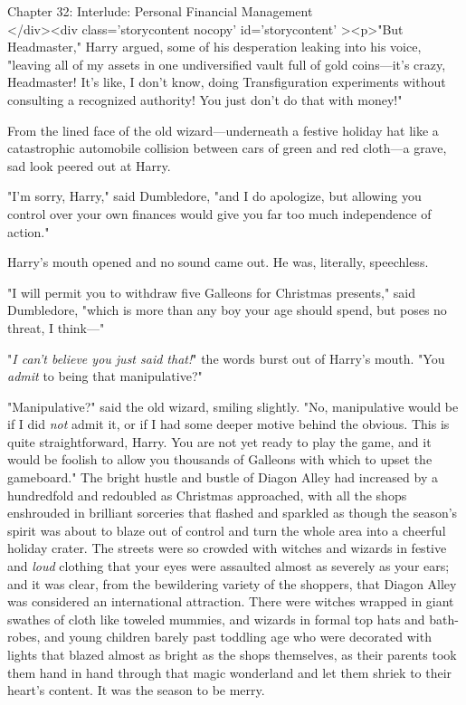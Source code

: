 
Chapter 32: Interlude: Personal Financial Management\\
</div><div  class='storycontent nocopy' id='storycontent' ><p>"But Headmaster," Harry argued, some of his desperation leaking into his voice, "leaving all of my assets in one undiversified vault full of gold coins---it's crazy, Headmaster! It's like, I don't know, doing Transfiguration experiments without consulting a recognized authority! You just don't do that with money!"

From the lined face of the old wizard---underneath a festive holiday hat like a catastrophic automobile collision between cars of green and red cloth---a grave, sad look peered out at Harry.

"I'm sorry, Harry," said Dumbledore, "and I do apologize, but allowing you control over your own finances would give you far too much independence of action."

Harry's mouth opened and no sound came out. He was, literally, speechless.

"I will permit you to withdraw five Galleons for Christmas presents," said Dumbledore, "which is more than any boy your age should spend, but poses no threat, I think---"

"\emph{I can't believe you just said that!}" the words burst out of Harry's mouth. "You \emph{admit} to being that manipulative?"

"Manipulative?" said the old wizard, smiling slightly. "No, manipulative would be if I did \emph{not} admit it, or if I had some deeper motive behind the obvious. This is quite straightforward, Harry. You are not yet ready to play the game, and it would be foolish to allow you thousands of Galleons with which to upset the gameboard."
\sbreak
The bright hustle and bustle of Diagon Alley had increased by a hundredfold and redoubled as Christmas approached, with all the shops enshrouded in brilliant sorceries that flashed and sparkled as though the season's spirit was about to blaze out of control and turn the whole area into a cheerful holiday crater. The streets were so crowded with witches and wizards in festive and \emph{loud} clothing that your eyes were assaulted almost as severely as your ears; and it was clear, from the bewildering variety of the shoppers, that Diagon Alley was considered an international attraction. There were witches wrapped in giant swathes of cloth like toweled mummies, and wizards in formal top hats and bath-robes, and young children barely past toddling age who were decorated with lights that blazed almost as bright as the shops themselves, as their parents took them hand in hand through that magic wonderland and let them shriek to their heart's content. It was the season to be merry.

